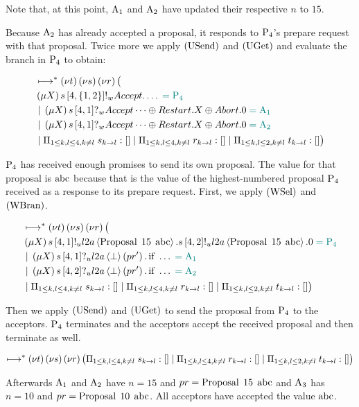 Note that, at this point, $\Acceptor{1}$ and $\Acceptor{2}$ have updated their respective $n$ to $15$.

Because $\Acceptor{2}$ has already accepted a proposal, it responds to $\Proposer{4}$'s prepare request with that proposal.
Twice more we apply $\RUsend$ and $\RUget$ and evaluate the branch in $\Proposer{4}$ to obtain:

\begin{align*}
&\mapstostar \NuChannels \big (\\
&\Mu{X} \SendWeaklyP{s}{4}{\Curly{1,2}}{\Accept}{\dots} \comment{= \Proposer{4}}\\
&\Or \Mu{X} \ReceiveWeaklyP{s}{4}{1}{\BeginPaCont} \comment{= \Acceptor{1}}\\
&\Or \Mu{X} \ReceiveWeaklyP{s}{4}{1}{\BeginPaCont} \comment{= \Acceptor{2}}\\
&\Or \InnerSessionQueues{s}
\Or \InnerSessionQueues{r}
\Or \OuterSessionQueues
\big )
\end{align*}

$\Proposer{4}$ has received enough promises to send its own proposal.
The value for that proposal is $\ABC$ because that is the value of the highest-numbered proposal $\Proposer{4}$ received as a response to its prepare request.
First, we apply $\RWsel$ and $\RWbran$.

\begin{align*}
&\mapstostar \NuChannels \big (\\
&\Mu{X} \SendUnreliableP{s}{4}{1}{\LTwoA}{\ProposalC{15}{\ABC}}.
\SendUnreliableP{s}{4}{2}{\LTwoA}{\ProposalC{15}{\ABC}}.\End \comment{= \Proposer{4}}\\
&\Or \Mu{X} \ReceiveUnreliableP{s}{4}{1}{\LTwoA}{\bot}{pr'}.\If{\dots}\comment{= \Acceptor{1}}\\
&\Or \Mu{X} \ReceiveUnreliableP{s}{4}{2}{\LTwoA}{\bot}{pr'}.\If{\dots}\comment{= \Acceptor{2}}\\
&\Or \InnerSessionQueues{s}
\Or \InnerSessionQueues{r}
\Or \OuterSessionQueues
\big )
\end{align*}

Then we apply $\RUsend$ and $\RUget$ to send the proposal from $\Proposer{4}$ to the acceptors.
$\Proposer{4}$ terminates and the acceptors accept the received proposal and then terminate as well.

\[\mapstostar
\NuChannels \big (\InnerSessionQueues{s}
\Or \InnerSessionQueues{r}
\Or \OuterSessionQueues
\big )\]

Afterwards $\Acceptor{1}$ and $\Acceptor{2}$ have $n = 15$ and $pr = \ProposalC{15}{\ABC}$ and $\Acceptor{3}$ has $n = 10$ and $pr = \ProposalC{10}{\ABC}$.
All acceptors have accepted the value $\ABC$.
